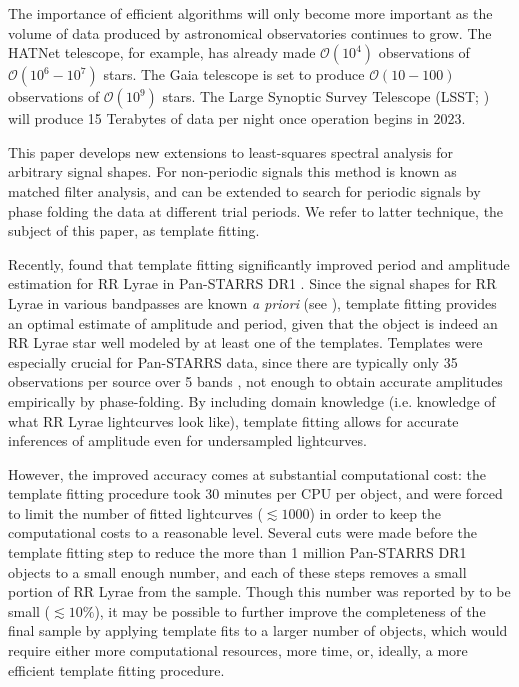 \documentclass[iop]{emulateapj}
\newcommand{\bigO}{\mathcal{O}}
\begin{document}
The importance of efficient algorithms will only become more important as the volume
of data produced by astronomical observatories continues to grow. The HATNet telescope,
for example, has already made $\bigO(10^4)$ observations of $\bigO(10^6-10^7)$ stars. 
The Gaia telescope \citep{GAIA} is set to produce $\bigO(10-100)$ observations of 
$\bigO(10^9)$ stars. The Large Synoptic Survey Telescope (LSST; \cite{LSST}) will 
produce 15 Terabytes of data per night once operation begins in 2023.

This paper develops new extensions to least-squares spectral analysis for arbitrary
signal shapes. For non-periodic signals this method is known as matched filter analysis,
and can be extended to search for periodic signals by phase folding the data
at different trial periods. We refer to latter technique, the subject of this paper, as
template fitting. 

Recently, \cite{Sesar_etal_2016} found that template fitting significantly improved
period and amplitude estimation for RR Lyrae in Pan-STARRS DR1 \citep{PanSTARRS}. Since the signal
shapes for RR Lyrae in various bandpasses are known \emph{a priori} (see \cite{Sesar_etal_2010}), 
template fitting provides an optimal estimate of amplitude and period,
given that the object is indeed an RR Lyrae star well modeled by at least one of the templates. 
Templates were especially crucial for Pan-STARRS data, since there are typically only 
35 observations per source over 5 bands \citep{Hernitschek_etal_2016}, not enough to obtain 
accurate amplitudes empirically by phase-folding. By including domain knowledge (i.e. knowledge of what RR Lyrae 
lightcurves look like), template fitting allows for accurate inferences of amplitude even 
for undersampled lightcurves.

However, the improved accuracy comes at substantial computational cost: the template fitting 
procedure took 30 minutes per CPU per object, and \cite{Sesar_etal_2016} were forced to limit
the number of fitted lightcurves ($\lesssim 1000$) in order to keep the computational costs
to a reasonable level. Several cuts were made before the template fitting step to reduce the
more than 1 million Pan-STARRS DR1 objects to a small enough number, and each of these steps
removes a small portion of RR Lyrae from the sample. Though this number was reported by
\cite{Sesar_etal_2016} to be small ($\lesssim 10\%$), it may be possible to further improve
the completeness of the final sample by applying template fits to a larger number of objects,
which would require either more computational resources, more time, or, ideally, a more efficient
template fitting procedure.
\end{document}
